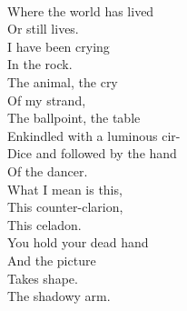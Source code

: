 \documentclass[smalldemyvopaper,11pt,twoside,onecolumn,openright,extrafontsizes]{memoir}
\begin{document}
\\Where the world has lived
\\Or still lives.
\\I have been crying
\\In the rock.
\\The animal, the cry
\\Of my strand,
\\The ballpoint, the table
\\Enkindled with a luminous cir-
\\Dice and followed by the hand
\\Of the dancer.
\\What I mean is this,
\\This counter-clarion,
\\This celadon.
\\You hold your dead hand
\\And the picture
\\Takes shape.
\\The shadowy arm.
\end{document}
